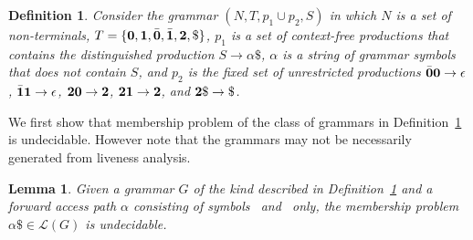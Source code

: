 \documentclass[9pt,preprint,letter,nonatbib]{sigplanconf}
\newtheorem{proposition}[theorem]{Proposition}
\newtheorem{definition}[theorem]{Definition}
\newtheorem{lemma}[theorem]{Lemma}
\begin{document}
\begin{definition}\label{def:specialgrammar}
Consider the  grammar $(N,T,  p_1\cup p_2,S)$  in which
$N$ is  a set  of non-terminals,  $T =  \{\mathbf{0}, \mathbf{1},
\bar{\mathbf{0}},  \bar{\mathbf{1}},  {\mathbf{2}},  \$\}$,   $p_1$  is  a  set  of
context-free    productions     that    contains    the
distinguished  production   $S  \rightarrow  \alpha\$$,
$\alpha$ is a  string of grammar symbols  that does not
contain $S$, and $p_2$ is the fixed set of unrestricted
productions    $\bar{\mathbf{0}}\mathbf{0}    \rightarrow    \epsilon$,
$\bar{\mathbf{1}}\mathbf{1}    \rightarrow   \epsilon$,    ${\mathbf{2}}\mathbf{0}
\rightarrow {\mathbf{2}}$,  ${\mathbf{2}}\mathbf{1} \rightarrow {\mathbf{2}}$,
and $\clazy\$ \rightarrow \$ $.
\end{definition}

We first show that membership problem of the class of grammars in
Definition~\ref{def:specialgrammar} is undecidable. However note that
the grammars may not be necessarily generated from liveness analysis.
\newcommand{\state}{\ensuremath{\mathsf{S}}}
\newcommand{\nont}[2]{\ensuremath{\mathsf{S}_{#1}^{#2}}}  
\begin{lemma}\label{lemma:grammar-undecidable}
Given a grammar    $G$    of   the    kind    described    in
Definition~\ref{def:specialgrammar}  and a forward access path $\alpha$
consisting  of symbols \acar\  and \acdr\  only, the membership problem
$\alpha\$ \in \mathscr{L}(G)$ is undecidable.
\end{lemma} 
\end{document}
